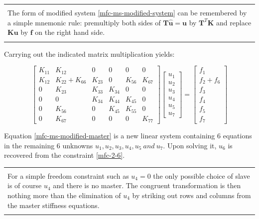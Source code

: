 \documentclass[10pt,b5paper,titlepage]{book}
\newcommand{\m}{\mathbf}
\newenvironment{bbox}[1][0.96]
{
    \begin{center}
        \begin{tabular}{|p{#1\textwidth}|}
            \hline\\
}
{
            \\\\\hline
        \end{tabular}
    \end{center}
}
\begin{document}
\begin{bbox}
    The form of modified system \eqref{mfc-ms-modified-system} can be remembered
    by a simple mnemonic rule: premultiply both sides of $
    \m{T} \m{\hat{u}} = \m{u} $
    by $ \m{T}^T \m{K} $ and replace $ \m{K} \m{u} $ by
    $ \m{f} $ on the right hand side.
\end{bbox}

Carrying out the indicated matrix multiplication yields:

\begin{equation}\label{mfc-ms-modified-master}
    \begin{bmatrix}
        K_{11} & K_{12} & 0 & 0 & 0 & 0 \\
        K_{12} & K_{22} + K_{66} & K_{23} & 0 & K_{56} & K_{67} \\
        0 & K_{23} & K_{33} & K_{34} & 0 & 0 \\
        0 & 0 & K_{34} & K_{44} & K_{45} & 0 \\
        0 & K_{56} & 0 & K_{45} & K_{55} & 0 \\
        0 & K_{67} & 0 & 0 & 0 & K_{77}
    \end{bmatrix}
    \begin{bmatrix}
        u_1 \\
        u_2 \\
        u_3 \\
        u_4 \\
        u_5 \\
        u_7
    \end{bmatrix}
    = \begin{bmatrix}
        f_1 \\
        f_2 + f_6 \\
        f_3 \\
        f_4 \\
        f_5 \\
        f_7
    \end{bmatrix}
\end{equation}

Equation \eqref{mfc-ms-modified-master} is a new linear system containing 6 equations
in the remaining 6 unknowns $ u_1, u_2, u_3, u_4, u_5\ and\ u_7 $. Upon
solving it, $ u_6 $ is recovered from the constraint \eqref{mfc-2-6}.

\begin{bbox}
    For a simple freedom constraint such as $ u_4 = 0 $ the only possible choice of slave
    is of course $ u_4 $ and there is no master. The congruent transformation is then
    nothing more than the elimination of $ u_4 $ by striking out rows and columns from
    the master stiffness equations.
\end{bbox}
\end{document}
